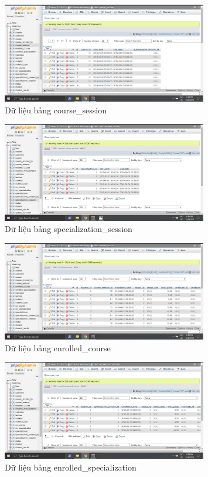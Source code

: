 \documentclass[12pt,a4paper,titlepage]{article}
\begin{document}
\begin{figure}[h!]
	\centering
	\caption{Dữ liệu bảng course_session}
	\includegraphics[width=0.8\textwidth]{images/dat5.png}
\end{figure}
\newpage
\begin{figure}[h!]
	\centering
	\caption{Dữ liệu bảng specialization_session}
	\includegraphics[width=0.8\textwidth]{images/dat16.png}
\end{figure}
\begin{figure}[h!]
	\centering
	\caption{Dữ liệu bảng enrolled_course}
	\includegraphics[width=0.8\textwidth]{images/dat6.png}
\end{figure}
\begin{figure}[h!]
	\centering
	\caption{Dữ liệu bảng enrolled_specialization}
	\includegraphics[width=0.8\textwidth]{images/dat7.png}
\end{figure}
\end{document}
